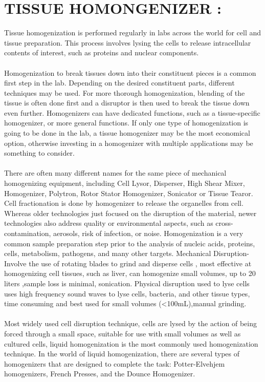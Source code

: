 \documentclass[a4paper,12pt]{article}
\begin{document}
  \section{TISSUE HOMONGENIZER :}
 
 \medspace
  
Tissue homogenization is performed regularly in labs across the world for cell and tissue preparation. This process involves lysing the cells to release intracellular contents of interest, such as proteins and nuclear components.
  \\
  \\
  Homogenization to break tissues down into their constituent pieces is a common first step in the lab. Depending on the desired constituent parts, different techniques may be used. For more thorough homogenization, blending of the tissue is often done first and a disruptor is then used to break the tissue down even further. Homogenizers can have dedicated functions, such as a tissue-specific homogenizer, or more general functions. If only one type of homogenization is going to be done in the lab, a tissue homogenizer may be the most economical option, otherwise investing in a homogenizer with multiple applications may be something to consider.
  \\
  \\
  There are often many different names for the same piece of mechanical homogenizing equipment, including Cell Lysor, Disperser, High Shear Mixer, Homogenizer, Polytron, Rotor Stator Homogenizer, Sonicator or Tissue Tearor.
  \\
  
  Cell fractionation is done by homogenizer to release the organelles from cell. Whereas older technologies just focused on the disruption of the material, newer technologies also address quality or environmental aspects, such as cross-contamination, aerosols, risk of infection, or noise. Homogenization is a very common sample preparation step prior to the analysis of nucleic acids, proteins, cells, metabolism, pathogens, and many other targets.
  Mechanical Disruption-
  Involve the use of rotating blades to grind and disperse cells , most effective at homogenizing cell tissues, such as liver, can homogenize small volumes, up to 20 liters ,sample loss is minimal, sonication.
  Physical disruption used to lyse cells uses high frequency sound waves to lyse cells, bacteria, and other tissue types, time consuming and best used for small volumes (<100mL),manual grinding.
  \\
  \\
  Most widely used cell disruption technique, cells are lysed by the action of being forced through a small space, suitable for use with small volumes as well as cultured cells, liquid homogenization is the most commonly used homogenization technique. In the world of liquid homogenization, there are several types of homogenizers that are designed to complete the task: Potter-Elvehjem homogenizers, French Presses, and the Dounce Homogenizer.
  \\
  \\
  
\end{document}
